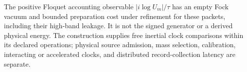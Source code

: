The positive Floquet accounting observable $|i\log U_m|/\tau$ has an
empty Fock vacuum and bounded preparation cost under refinement for these
packets, including their high-band leakage. It is not the signed generator
or a derived physical energy. The construction supplies free inertial
clock comparisons within its declared operations; physical source admission,
mass selection, calibration, interacting or accelerated clocks, and
distributed record-collection latency are separate.
